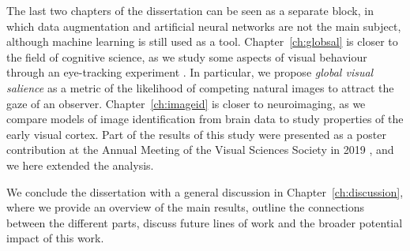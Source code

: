 {The last two chapters of the dissertation can be seen as a separate block, in which data augmentation and artificial neural networks are not the main subject, although machine learning is still used as a tool. Chapter~\ref{ch:globsal} is closer to the field of cognitive science, as we study some aspects of visual behaviour through an eye-tracking experiment \citep{hergar2019globsal}. In particular, we propose \textit{global visual salience} as a metric of the likelihood of competing natural images to attract the gaze of an observer. Chapter~\ref{ch:imageid} is closer to neuroimaging, as we compare models of image identification from brain data to study properties of the early visual cortex. Part of the results of this study were presented as a poster contribution at the Annual Meeting of the Visual Sciences Society in 2019 \citep{hergar2019imageid}, and we here extended the analysis.

We conclude the dissertation with a general discussion in Chapter~\ref{ch:discussion}, where we provide an overview of the main results, outline the connections between the different parts, discuss future lines of work and the broader potential impact of this work.

\chapterbibliography
}
